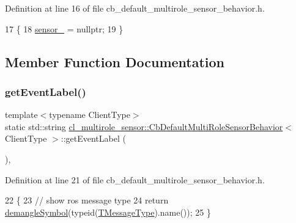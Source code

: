 Definition at line 16 of file cb\+\_\+default\+\_\+multirole\+\_\+sensor\+\_\+behavior.\+h.


\begin{DoxyCode}
17   \{
18     \hyperlink{classcl__multirole__sensor_1_1CbDefaultMultiRoleSensorBehavior_a201893c3c859259eac3166405f3509cb}{sensor\_} = \textcolor{keyword}{nullptr};
19   \}
\end{DoxyCode}


\subsection{Member Function Documentation}
\mbox{\label{classcl__multirole__sensor_1_1CbDefaultMultiRoleSensorBehavior_aced8a722660f2ecd7bad11a9dde31aa8}} 
\subsubsection{\texorpdfstring{get\+Event\+Label()}{getEventLabel()}}
{\footnotesize\ttfamily template$<$typename Client\+Type$>$ \\
static std\+::string \hyperlink{classcl__multirole__sensor_1_1CbDefaultMultiRoleSensorBehavior}{cl\+\_\+multirole\+\_\+sensor\+::\+Cb\+Default\+Multi\+Role\+Sensor\+Behavior}$<$ Client\+Type $>$\+::get\+Event\+Label (\begin{DoxyParamCaption}{ }\end{DoxyParamCaption})\hspace{0.3cm}{\ttfamily [inline]}, {\ttfamily [static]}}



Definition at line 21 of file cb\+\_\+default\+\_\+multirole\+\_\+sensor\+\_\+behavior.\+h.


\begin{DoxyCode}
22   \{
23     \textcolor{comment}{// show ros message type}
24     \textcolor{keywordflow}{return} \hyperlink{namespacesmacc_1_1introspection_a2f495108db3e57604d8d3ff5ef030302}{demangleSymbol}(\textcolor{keyword}{typeid}(\hyperlink{classcl__multirole__sensor_1_1CbDefaultMultiRoleSensorBehavior_aa23bc8c99de1eddad01d094bdab62aa4}{TMessageType}).name());
25   \}
\end{DoxyCode}
\mbox{\label{classcl__multirole__sensor_1_1CbDefaultMultiRoleSensorBehavior_a5ac29f93cc91e23715f51ade94467cae}} 
